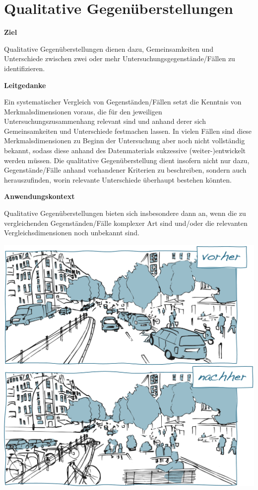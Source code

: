 \documentclass[
  a4paper,
]{book}
\begin{document}
\section{Qualitative Gegenüberstellungen}\label{qualitative-gegenuxfcberstellungen}

\textbf{Ziel}

Qualitative Gegenüberstellungen dienen dazu, Gemeinsamkeiten und Unterschiede zwischen zwei oder mehr Untersuchungsgegenstände/Fällen zu identifizieren.

\textbf{Leitgedanke}

Ein systematischer Vergleich von Gegenständen/Fällen setzt die Kenntnis von Merkmalsdimensionen voraus, die für den jeweiligen Untersuchungszusammenhang relevant sind und anhand derer sich Gemeinsamkeiten und Unterschiede festmachen lassen. In vielen Fällen sind diese Merkmalsdimensionen zu Beginn der Untersuchung aber noch nicht vollständig bekannt, sodass diese anhand des Datenmaterials sukzessive (weiter-)entwickelt werden müssen. Die qualitative Gegenüberstellung dient insofern nicht nur dazu, Gegenstände/Fälle anhand vorhandener Kriterien zu beschreiben, sondern auch herauszufinden, worin relevante Unterschiede überhaupt bestehen könnten.

\textbf{Anwendungskontext}

Qualitative Gegenüberstellungen bieten sich insbesondere dann an, wenn die zu vergleichenden Gegenständen/Fälle komplexer Art sind und/oder die relevanten Vergleichsdimensionen noch unbekannt sind.

\begin{center}\includegraphics{Figures/06-03-vorher-nachher} \end{center}
\end{document}
